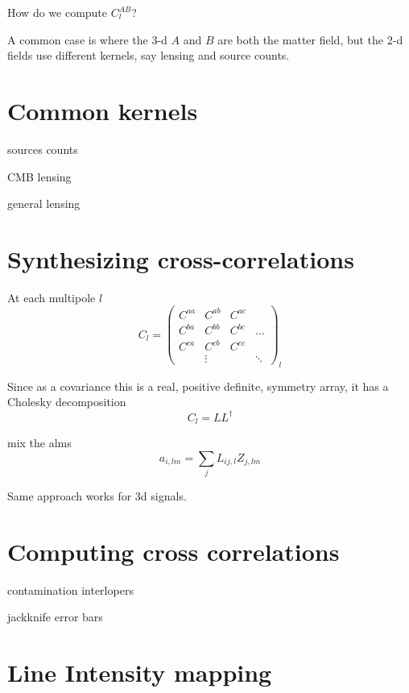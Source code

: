 How do we compute $C^{AB}_l$?

A common case is where the 3-d $A$ and $B$ are both the matter field, but the 2-d fields use different kernels, say lensing and source counts.

\section{Common kernels}

sources counts

CMB lensing

general lensing


\section{Synthesizing cross-correlations}


At each multipole $l$
\begin{equation}
  C_l = \left( \begin{array}{cccc}
    C^{aa} & C^{ab} &  C^{ac} &  \\
    C^{ba} & C^{bb} &  C^{bc} & \dots \\
    C^{ca} & C^{cb} &  C^{cc} &  \\
    & \vdots & & \ddots
  \end{array} \right)_l
\end{equation}

Since as a covariance this is a real, positive definite, symmetry array, it has a Cholesky decomposition
\begin{equation}
  C_l = LL^\dag
\end{equation}

mix the alms
\begin{equation}
  a_{i,lm} =\sum_j L_{ij,l} Z_{j,lm}
\end{equation}

Same approach works for 3d signals.

\section{Computing cross correlations}

contamination
interlopers

jackknife error bars



\section{Line Intensity mapping}
